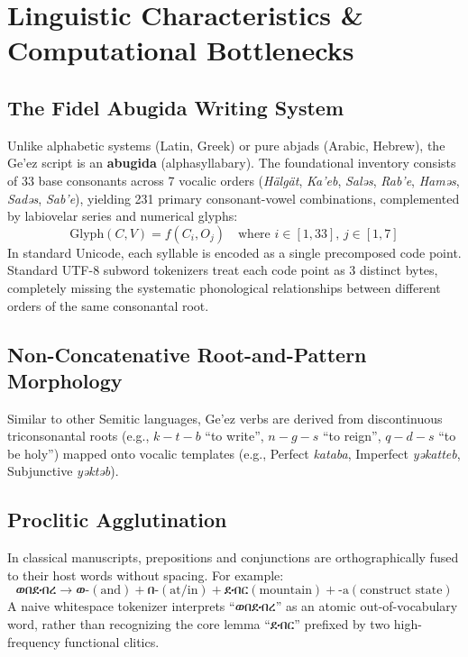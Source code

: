 \documentclass[11pt,a4paper]{article}
\begin{document}
\section{Linguistic Characteristics \& Computational Bottlenecks}
\subsection{The Fidel Abugida Writing System}
Unlike alphabetic systems (Latin, Greek) or pure abjads (Arabic, Hebrew), the Ge'ez script is an \textbf{abugida} (alphasyllabary). The foundational inventory consists of 33 base consonants across 7 vocalic orders (\textit{Hälgät}, \textit{Ka'eb}, \textit{Saləs}, \textit{Rab'e}, \textit{Haməs}, \textit{Sadəs}, \textit{Sab'e}), yielding 231 primary consonant-vowel combinations, complemented by labiovelar series and numerical glyphs:
\begin{equation}
\text{Glyph}(C, V) = f(C_i, O_j) \quad \text{where } i \in [1, 33], \, j \in [1, 7]
\end{equation}
In standard Unicode, each syllable is encoded as a single precomposed code point. Standard UTF-8 subword tokenizers treat each code point as 3 distinct bytes, completely missing the systematic phonological relationships between different orders of the same consonantal root.

\subsection{Non-Concatenative Root-and-Pattern Morphology}
Similar to other Semitic languages, Ge'ez verbs are derived from discontinuous triconsonantal roots (e.g., $k-t-b$ ``to write'', $n-g-s$ ``to reign'', $q-d-s$ ``to be holy'') mapped onto vocalic templates (e.g., Perfect \textit{kataba}, Imperfect \textit{yəkatteb}, Subjunctive \textit{yəktəb}).

\subsection{Proclitic Agglutination}
In classical manuscripts, prepositions and conjunctions are orthographically fused to their host words without spacing. For example:
\begin{equation}
\text{ወበደብረ} \rightarrow \text{ወ-} (\text{and}) + \text{በ-} (\text{at/in}) + \text{ደብር} (\text{mountain}) + \text{-a} (\text{construct state})
\end{equation}
A naive whitespace tokenizer interprets ``ወበደብረ'' as an atomic out-of-vocabulary word, rather than recognizing the core lemma ``ደብር'' prefixed by two high-frequency functional clitics.
\end{document}
